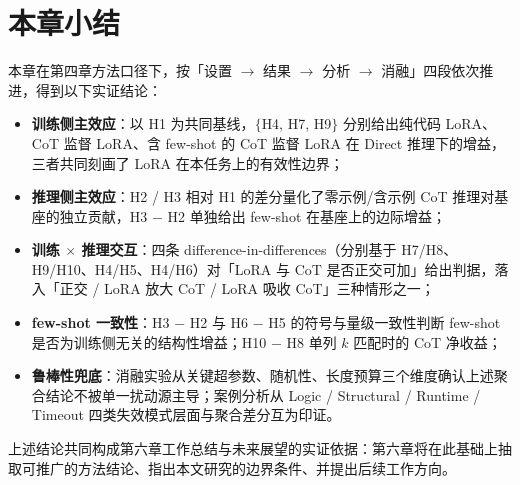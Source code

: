 \section{本章小结}

本章在第四章方法口径下，按「设置 $\to$ 结果 $\to$ 分析 $\to$ 消融」四段依次推进，得到以下实证结论：
\begin{itemize}
    \item \textbf{训练侧主效应}：以 H1 为共同基线，$\{$H4, H7, H9$\}$ 分别给出纯代码 LoRA、CoT 监督 LoRA、含 few-shot 的 CoT 监督 LoRA 在 Direct 推理下的增益，三者共同刻画了 LoRA 在本任务上的有效性边界；
    \item \textbf{推理侧主效应}：H2 / H3 相对 H1 的差分量化了零示例/含示例 CoT 推理对基座的独立贡献，H3 − H2 单独给出 few-shot 在基座上的边际增益；
    \item \textbf{训练 $\times$ 推理交互}：四条 difference-in-differences（分别基于 H7/H8、H9/H10、H4/H5、H4/H6）对「LoRA 与 CoT 是否正交可加」给出判据，落入「正交 / LoRA 放大 CoT / LoRA 吸收 CoT」三种情形之一；
    \item \textbf{few-shot 一致性}：H3 − H2 与 H6 − H5 的符号与量级一致性判断 few-shot 是否为训练侧无关的结构性增益；H10 − H8 单列 $k$ 匹配时的 CoT 净收益；
    \item \textbf{鲁棒性兜底}：消融实验从关键超参数、随机性、长度预算三个维度确认上述聚合结论不被单一扰动源主导；案例分析从 Logic / Structural / Runtime / Timeout 四类失效模式层面与聚合差分互为印证。
\end{itemize}

上述结论共同构成第六章工作总结与未来展望的实证依据：第六章将在此基础上抽取可推广的方法结论、指出本文研究的边界条件、并提出后续工作方向。

